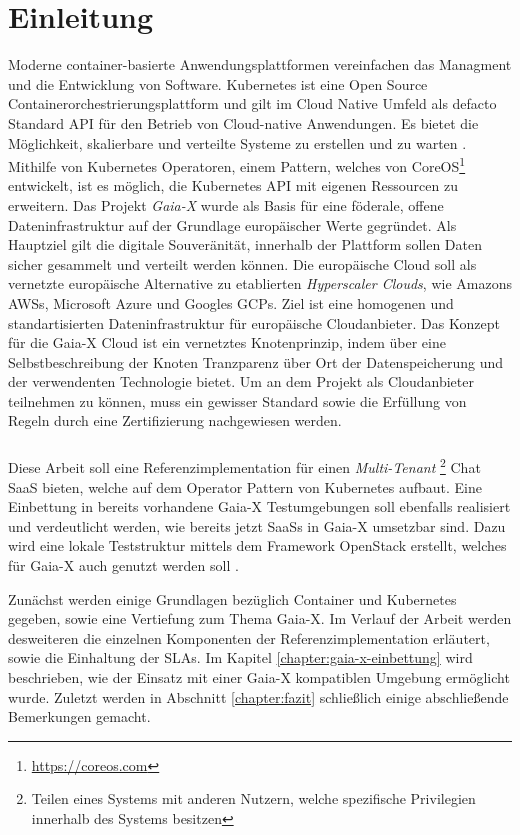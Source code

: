 \chapter{Einleitung}
\label{chap:einleitung}

Moderne container-basierte Anwendungsplattformen vereinfachen das Managment und die Entwicklung
von Software. Kubernetes \cite{kubernetes} ist eine Open Source Containerorchestrierungsplattform und gilt im
Cloud Native Umfeld als defacto Standard API für den Betrieb von Cloud-native Anwendungen.
Es bietet die Möglichkeit, skalierbare und verteilte Systeme zu erstellen und zu warten \cite{Burns2019}.
Mithilfe von Kubernetes Operatoren, einem Pattern, welches von CoreOS\footnote{\url{https://coreos.com}} entwickelt,
ist es möglich, die Kubernetes API mit eigenen Ressourcen zu erweitern.
Das Projekt \emph{Gaia-X} wurde als Basis für eine föderale, offene Dateninfrastruktur auf der Grundlage europäischer Werte gegründet.
Als Hauptziel gilt die digitale Souveränität, innerhalb der Plattform sollen Daten sicher gesammelt und verteilt werden können.
Die europäische Cloud soll als vernetzte europäische Alternative zu etablierten \emph{Hyperscaler Clouds}, wie Amazons \acp{AWS},
Microsoft Azure und Googles \acp{GCP}. Ziel ist eine homogenen und standartisierten Dateninfrastruktur für europäische Cloudanbieter.
Das Konzept für die Gaia-X Cloud ist ein vernetztes Knotenprinzip, indem über eine Selbstbeschreibung der Knoten
Tranzparenz über Ort der Datenspeicherung und der verwendenten Technologie bietet. Um an dem Projekt als Cloudanbieter
teilnehmen zu können, muss ein gewisser Standard sowie die Erfüllung von Regeln durch eine Zertifizierung nachgewiesen werden.\cite{BMWi2019}

\paragraph{}
Diese Arbeit soll eine Referenzimplementation für einen \emph{Multi-Tenant}
\footnote{Teilen eines Systems mit anderen Nutzern, welche spezifische Privilegien innerhalb des Systems besitzen}
Chat \ac{SaaS} bieten, welche auf dem Operator Pattern von Kubernetes aufbaut.
Eine Einbettung in bereits vorhandene Gaia-X Testumgebungen soll ebenfalls realisiert und verdeutlicht werden,
wie bereits jetzt \acp{SaaS} in Gaia-X umsetzbar sind. Dazu wird eine lokale Teststruktur mittels dem Framework OpenStack erstellt,
welches für Gaia-X auch genutzt werden soll \cite{scs}.

Zunächst werden einige Grundlagen bezüglich Container und Kubernetes gegeben, sowie eine Vertiefung zum Thema Gaia-X.
Im Verlauf der Arbeit werden desweiteren die einzelnen Komponenten der Referenzimplementation erläutert, sowie die Einhaltung der \acp{SLA}.
Im Kapitel \ref{chapter:gaia-x-einbettung} wird beschrieben, wie der Einsatz mit einer Gaia-X kompatiblen Umgebung ermöglicht wurde.
Zuletzt werden in Abschnitt \ref{chapter:fazit} schließlich einige abschließende Bemerkungen gemacht.